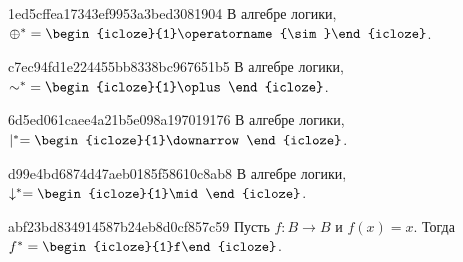 \begin{note}{1ed5cffea17343ef9953a3bed3081904}
    В алгебре логики, \({ \oplus^* = \begin{icloze}{1}\operatorname{\sim}\end{icloze} }\).
\end{note}

\begin{note}{c7ec94fd1e224455bb8338bc967651b5}
    В алгебре логики, \({ \operatorname{\sim}^* = \begin{icloze}{1}\oplus\end{icloze} }\).
\end{note}

\begin{note}{6d5ed061caee4a21b5e098a197019176}
    В алгебре логики, \({ \mid^* = \begin{icloze}{1}\downarrow\end{icloze} }\).
\end{note}

\begin{note}{d99e4bd6874d47aeb0185f58610c8ab8}
    В алгебре логики, \({ \downarrow^* = \begin{icloze}{1}\mid\end{icloze} }\).
\end{note}

\begin{note}{abf23bd834914587b24eb8d0cf857c59}
    Пусть \({ f : B \to B }\) и \({ f(x) = x }\).
    Тогда \({ f^* = \begin{icloze}{1}f\end{icloze} }\).
\end{note}


